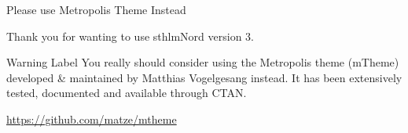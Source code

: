 \documentclass[\string~/GitHub/sthlmNordBeamerTheme/sthlmNordLightDemo.tex]{subfiles}
\begin{document}
\begin{frame}{Please use Metropolis Theme Instead}

	Thank you for wanting to use sthlmNord version 3.

	\vspace{1em}
	\begin{alertblock}{Warning Label}
		\alert{You really should consider} using the Metropolis
		theme (mTheme) developed \& maintained by Matthias
		Vogelgesang instead. It has been extensively tested, documented and available through CTAN.
	\end{alertblock}
	\begin{center}
		\url{https://github.com/matze/mtheme}
	\end{center}
\end{frame}
\end{document}
